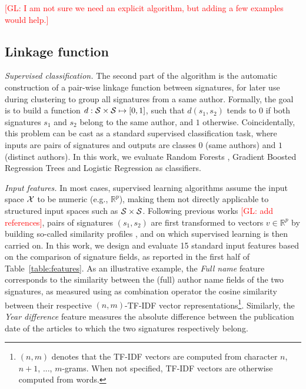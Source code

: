 \documentclass{article}
\newcommand{\glnote}[1]{\textcolor{red}{[GL: #1]}}
\begin{document}
\glnote{I am not sure we need an explicit algorithm, but adding a few examples would help.}

\subsection{Linkage function}
\label{methods:linkage}

\textit{Supervised classification.} The second part of the algorithm is the
automatic construction of a pair-wise linkage function between signatures, for
later use during clustering to group all signatures from a same author.
Formally, the goal is to build a function $d: {\cal S} \times {\cal S} \mapsto
[0, 1]$, such that $d(s_1, s_2)$ tends to $0$ if both signatures $s_1$ and
$s_2$ belong to the same author, and $1$ otherwise. Coincidentally, this
problem can be cast as a standard supervised classification task, where inputs
are pairs of signatures and outputs are classes $0$ (same authors) and $1$
(distinct authors). In this work, we evaluate Random Forests \citep{breiman2001random},
Gradient Boosted Regression Trees \citep{friedman2001greedy} and Logistic Regression \citep{fan2008liblinear} as classifiers.

\textit{Input features.} In most cases, supervised learning algorithms assume
the input space ${\cal X}$ to be numeric (e.g., $\mathbb{R}^p$), making them
not directly applicable to structured input spaces such as ${\cal S} \times
{\cal S}$. Following previous works \glnote{add references}, pairs of
signatures $(s_1, s_2)$ are first transformed to vectors $v \in \mathbb{R}^p$
by building so-called similarity profiles
\citep{treeratpituk2009disambiguating}, and on which supervised learning is
then carried on. In this work, we design and evaluate 15 standard input
features based on the comparison of signature fields, as reported in the first
half of Table~\ref{table:features}. As an illustrative example, the
\textit{Full name} feature corresponds to the similarity between the (full)
author name fields of the two signatures, as measured using as combination
operator the cosine similarity between their respective $(n,m)$-TF-IDF vector
representations\footnote{$(n,m)$ denotes that the TF-IDF vectors are computed
from character $n$, $n+1$, ..., $m$-grams. When not specified, TF-IDF vectors
are otherwise computed from words.}. Similarly, the \textit{Year difference}
feature measures the absolute difference between the publication date of the
articles to which the two signatures respectively belong.
\end{document}
